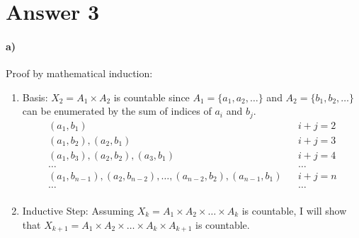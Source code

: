 \documentclass[12pt]{article}
\newcommand\+{\mkern2mu}
\let\eps\varepsilon
\begin{document}
\begin{itemize}
\end{itemize}

\newpage

\section*{Answer 3}
\paragraph{a)}
Proof by mathematical induction:
\begin{enumerate}
\item Basis: $X_2 = A_1 \times A_2$ is countable since $A_1 = \{a_1, a_2, \dotsc \}$ and $A_2 = \{b_1, b_2, \dotsc \}$ can be enumerated by the sum of indices of $a_i$ and $b_j$.
\begin{align*}
(a_1, b_1) && i + j = 2 \\
(a_1, b_2), (a_2, b_1) && i + j = 3 \\
(a_1, b_3), (a_2, b_2), (a_3, b_1) && i + j = 4 \\
\dotsc && \dotsc \\
(a_1, b_{n-1}), (a_2, b_{n-2}), \dotsc, (a_{n-2}, b_2), (a_{n-1}, b_1) && i + j = n\\
\dotsc && \dotsc \\
\end{align*}
\item Inductive Step: Assuming $X_k = A_1 \times A_2 \times \dotsc \times A_k$ is countable, I will show that $X_{k+1} = A_1 \times A_2 \times \dotsc \times A_k \times A_{k+1}$ is countable.
\end{enumerate}
\end{document}
